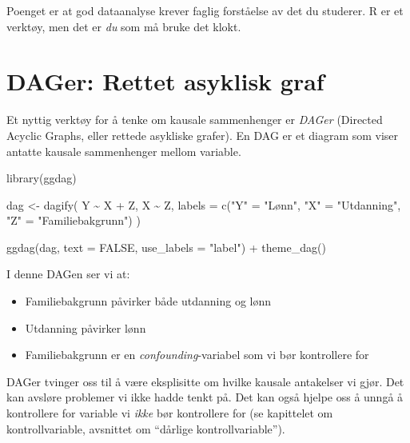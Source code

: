 \documentclass[
  norsk,
  letterpaper,
  DIV=11,
  numbers=noendperiod]{scrreprt}
\newenvironment{Shaded}{\begin{snugshade}}{\end{snugshade}}
\newcommand{\AttributeTok}[1]{\textcolor[rgb]{0.40,0.45,0.13}{#1}}
\newcommand{\ConstantTok}[1]{\textcolor[rgb]{0.56,0.35,0.01}{#1}}
\newcommand{\FunctionTok}[1]{\textcolor[rgb]{0.28,0.35,0.67}{#1}}
\newcommand{\NormalTok}[1]{\textcolor[rgb]{0.00,0.23,0.31}{#1}}
\newcommand{\OtherTok}[1]{\textcolor[rgb]{0.00,0.23,0.31}{#1}}
\newcommand{\SpecialCharTok}[1]{\textcolor[rgb]{0.37,0.37,0.37}{#1}}
\newcommand{\StringTok}[1]{\textcolor[rgb]{0.13,0.47,0.30}{#1}}
\providecommand{\tightlist}{%
  \setlength{\itemsep}{0pt}\setlength{\parskip}{0pt}}
\theoremstyle{definition}
\theoremstyle{remark}
\begin{document}
Poenget er at god dataanalyse krever faglig forståelse av det du
studerer. R er et verktøy, men det er \emph{du} som må bruke det klokt.

\section{DAGer: Rettet asyklisk graf}\label{dager-rettet-asyklisk-graf}

Et nyttig verktøy for å tenke om kausale sammenhenger er \emph{DAGer}
(Directed Acyclic Graphs, eller rettede asykliske grafer). En DAG er et
diagram som viser antatte kausale sammenhenger mellom variable.

\begin{Shaded}
\begin{Highlighting}[]
\FunctionTok{library}\NormalTok{(ggdag)}

\NormalTok{dag }\OtherTok{\textless{}{-}} \FunctionTok{dagify}\NormalTok{(}
\NormalTok{  Y }\SpecialCharTok{\textasciitilde{}}\NormalTok{ X }\SpecialCharTok{+}\NormalTok{ Z,}
\NormalTok{  X }\SpecialCharTok{\textasciitilde{}}\NormalTok{ Z,}
  \AttributeTok{labels =} \FunctionTok{c}\NormalTok{(}\StringTok{"Y"} \OtherTok{=} \StringTok{"Lønn"}\NormalTok{,}
             \StringTok{"X"} \OtherTok{=} \StringTok{"Utdanning"}\NormalTok{,}
             \StringTok{"Z"} \OtherTok{=} \StringTok{"Familiebakgrunn"}\NormalTok{)}
\NormalTok{)}

\FunctionTok{ggdag}\NormalTok{(dag, }\AttributeTok{text =} \ConstantTok{FALSE}\NormalTok{, }\AttributeTok{use\_labels =} \StringTok{"label"}\NormalTok{) }\SpecialCharTok{+}
  \FunctionTok{theme\_dag}\NormalTok{()}
\end{Highlighting}
\end{Shaded}

I denne DAGen ser vi at:

\begin{itemize}
\tightlist
\item
  Familiebakgrunn påvirker både utdanning og lønn
\item
  Utdanning påvirker lønn
\item
  Familiebakgrunn er en \emph{confounding}-variabel som vi bør
  kontrollere for
\end{itemize}

DAGer tvinger oss til å være eksplisitte om hvilke kausale antakelser vi
gjør. Det kan avsløre problemer vi ikke hadde tenkt på. Det kan også
hjelpe oss å unngå å kontrollere for variable vi \emph{ikke} bør
kontrollere for (se kapittelet om kontrollvariable, avsnittet om
``dårlige kontrollvariable'').
\end{document}
